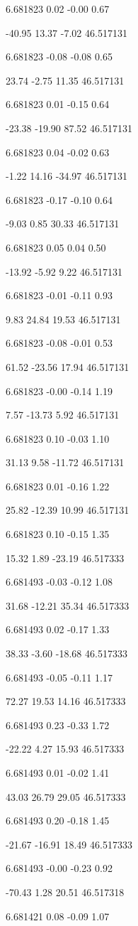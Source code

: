 6.681823
0.02
-0.00
0.67

-40.95
13.37
-7.02
46.517131

6.681823
-0.08
-0.08
0.65

23.74
-2.75
11.35
46.517131

6.681823
0.01
-0.15
0.64

-23.38
-19.90
87.52
46.517131

6.681823
0.04
-0.02
0.63

-1.22
14.16
-34.97
46.517131

6.681823
-0.17
-0.10
0.64

-9.03
0.85
30.33
46.517131

6.681823
0.05
0.04
0.50

-13.92
-5.92
9.22
46.517131

6.681823
-0.01
-0.11
0.93

9.83
24.84
19.53
46.517131

6.681823
-0.08
-0.01
0.53

61.52
-23.56
17.94
46.517131

6.681823
-0.00
-0.14
1.19

7.57
-13.73
5.92
46.517131

6.681823
0.10
-0.03
1.10

31.13
9.58
-11.72
46.517131

6.681823
0.01
-0.16
1.22

25.82
-12.39
10.99
46.517131

6.681823
0.10
-0.15
1.35

15.32
1.89
-23.19
46.517333

6.681493
-0.03
-0.12
1.08

31.68
-12.21
35.34
46.517333

6.681493
0.02
-0.17
1.33

38.33
-3.60
-18.68
46.517333

6.681493
-0.05
-0.11
1.17

72.27
19.53
14.16
46.517333

6.681493
0.23
-0.33
1.72

-22.22
4.27
15.93
46.517333

6.681493
0.01
-0.02
1.41

43.03
26.79
29.05
46.517333

6.681493
0.20
-0.18
1.45

-21.67
-16.91
18.49
46.517333

6.681493
-0.00
-0.23
0.92

-70.43
1.28
20.51
46.517318

6.681421
0.08
-0.09
1.07

